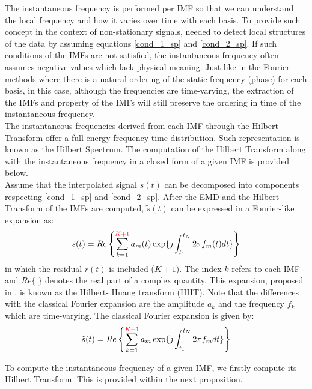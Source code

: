 The instantaneous frequency is performed per IMF so that we can understand the local frequency and how it varies over time with each basis. To provide such concept in the context of non-stationary signals, \cite{Huang1998} needed to detect local structures of the data by assuming equations \ref{cond_1_sp} and \ref{cond_2_sp}. If such conditions of the IMFs are not satisfied, the instantaneous frequency often assumes negative values which lack physical meaning. Just like in the Fourier methods where there is a natural ordering of the static frequency (phase) for each basis, in this case, although the frequencies are time-varying, the extraction of the IMFs and property of the IMFs will still preserve the ordering in time of the instantaneous frequency. \\
The instantaneous frequencies derived from each IMF through the Hilbert Transform offer a full energy-frequency-time distribution. Such representation is known as the Hilbert Spectrum. The computation of the Hilbert Transform along with the instantaneous frequency in a closed form of a given IMF is provided below.\\
Assume that the interpolated signal $\tilde{s}(t)$ can be decomposed into components respecting \ref{cond_1_sp} and \ref{cond_2_sp}. After the EMD and the Hilbert Transform of the IMFs are computed, $\tilde{s}(t)$ can be expressed in a Fourier-like expansion as:
 \[
 \tilde{s}(t) = Re\left\{ \sum_{k=1}^{\textcolor{red}{K+1}}  a_m(t)  \exp\{\jmath \int_{t_1}^{t_N} 2 \pi f_m(t) d t\} \right\}
 \]
 \noindent  in which the residual  $r(t)$  is included ($K+1$). The index $k$ refers to each IMF and $Re\{.\}$  denotes the real part of a complex quantity. This expansion, proposed in \cite{Huang1998},  is known as the Hilbert- Huang  transform (HHT). Note that the differences with the classical Fourier expansion are the amplitude $a_k$ and the frequency $f_k$ which are time-varying. The classical Fourier expansion is given by:
  \[
 \tilde{s}(t) = Re\left\{ \sum_{k=1}^{\textcolor{red}{K+1}}  a_m  \exp\{\jmath \int_{t_1}^{t_N} 2 \pi f_m d t\} \right\}
 \]
 
 To compute the instantaneous frequency of a given IMF, we firstly compute its Hilbert Transform. This is provided within the next proposition.


